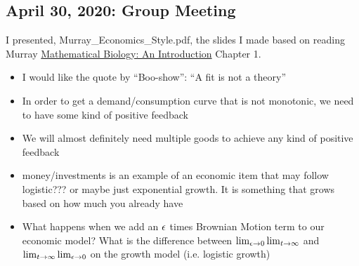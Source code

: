 \subsection{April 30, 2020: Group Meeting}
I presented, Murray\_Economics\_Style.pdf, the slides I made based on reading Murray \underline{Mathematical Biology: An Introduction} Chapter 1. 
\begin{itemize}
	\item I would like the quote by ``Boo-show'': ``A fit is not a theory''
	\item In order to get a demand/consumption curve that is not monotonic, we need to have some kind of positive feedback
	\item We will almost definitely need multiple goods to achieve any kind of positive feedback
	\item money/investments is an example of an economic item that may follow logistic??? or maybe just exponential growth. It is something that grows based on how much you already have
	\item What happens when we add an $\epsilon$ times Brownian Motion term to our economic model? What is the difference between $\lim_{\epsilon \rightarrow 0} \lim_{t\rightarrow\infty}$ and $\lim_{t\rightarrow\infty} \lim_{\epsilon \rightarrow 0}$ on the growth model (i.e. logistic growth)
\end{itemize}




